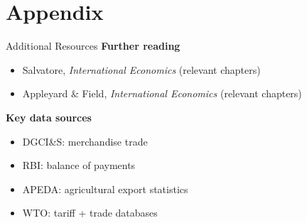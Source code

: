 \documentclass[
  ignorenonframetext,
  aspectratio=169,
]{beamer}
\makeatletter
\providecommand{\tightlist}{%
  \setlength{\itemsep}{0pt}\setlength{\parskip}{0pt}}
\let\quarto@originallabel\label
\DeclareRobustCommand*{\label}[1]{\quarto@originallabel{#1}}
\makeatother
\begin{document}
\section{Appendix}\label{appendix}

\begin{frame}{Additional Resources}
\label{additional-resources}
\textbf{Further reading}

\begin{itemize}
\tightlist
\item
  Salvatore, \emph{International Economics} (relevant chapters)
\item
  Appleyard \& Field, \emph{International Economics} (relevant chapters)
\end{itemize}

\textbf{Key data sources}

\begin{itemize}
\tightlist
\item
  DGCI\&S: merchandise trade
\item
  RBI: balance of payments
\item
  APEDA: agricultural export statistics
\item
  WTO: tariff + trade databases
\end{itemize}
\end{frame}
\end{document}
